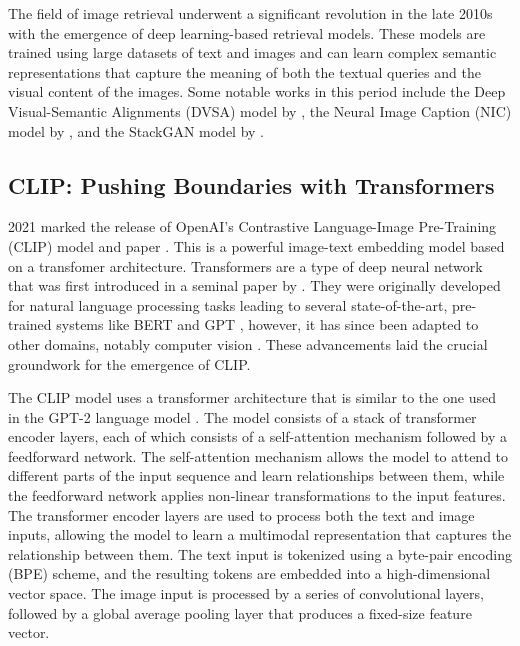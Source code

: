 \documentclass{l4proj}
\begin{document}
The field of image retrieval underwent a significant revolution in the late 2010s with the emergence of deep learning-based retrieval models. These models are trained using large datasets of text and images and can learn complex semantic representations that capture the meaning of both the textual queries and the visual content of the images. Some notable works in this period include the Deep Visual-Semantic Alignments (DVSA) model by \cite{karpathy2015dvsa}, the Neural Image Caption (NIC) model by \cite{vinyals2015nic}, and the StackGAN model by \cite{zhang2017stackgan}.


\subsection{CLIP: Pushing Boundaries with Transformers}
2021 marked the release of OpenAI's Contrastive Language-Image Pre-Training (CLIP) model and paper \citep{radford2021clip}. This is a powerful image-text embedding model based on a transfomer architecture. Transformers are a type of deep neural network that was first introduced in a seminal paper by \cite{vaswani2017attention}. They were originally developed for natural language processing tasks leading to several state-of-the-art, pre-trained systems like BERT \citep{devlin2018bert} and GPT \citep{radford2018gpt}, however, it has since been adapted to other domains, notably computer vision \citep{dosovitskiy2020vit}. These advancements laid the crucial groundwork for the emergence of CLIP.

The CLIP model uses a transformer architecture that is similar to the one used in the GPT-2 language model \citep{radford2019gpt2}. The model consists of a stack of transformer encoder layers, each of which consists of a self-attention mechanism followed by a feedforward network. The self-attention mechanism allows the model to attend to different parts of the input sequence and learn relationships between them, while the feedforward network applies non-linear transformations to the input features. The transformer encoder layers are used to process both the text and image inputs, allowing the model to learn a multimodal representation that captures the relationship between them. The text input is tokenized using a byte-pair encoding (BPE) scheme, and the resulting tokens are embedded into a high-dimensional vector space. The image input is processed by a series of convolutional layers, followed by a global average pooling layer that produces a fixed-size feature vector.
\end{document}
